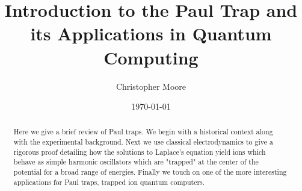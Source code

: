 \documentclass[aps,prb,twocolumn,superscriptaddress]{revtex4-1}
\begin{document}

\title{Introduction to the Paul Trap and its Applications in Quantum Computing}


\author{Christopher Moore}






\date{\today}

\begin{abstract}
Here we give a brief review of Paul traps. We begin with a historical context along with the experimental background. Next we use classical electrodynamics to give a rigorous proof detailing how the solutions to Laplace's equation yield ions which behave as simple harmonic oscillators which are "trapped" at the center of the potential for a broad range of energies. Finally we touch on one of the more interesting applications for Paul traps, trapped ion quantum computers.
\end{abstract}

\pacs{}

\maketitle
\end{document}
